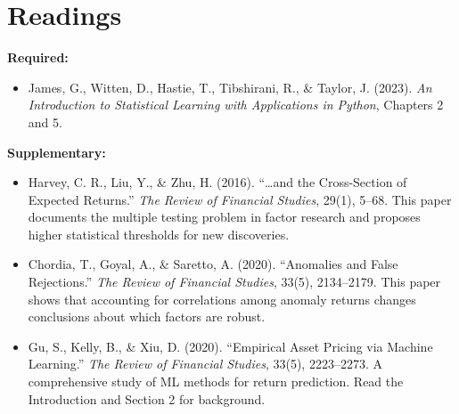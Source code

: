 \documentclass[11pt,a4paper]{article}
\begin{document}
\section*{Readings}

\textbf{Required:}
\begin{itemize}
    \item James, G., Witten, D., Hastie, T., Tibshirani, R., \& Taylor, J. (2023). \textit{An Introduction to Statistical Learning with Applications in Python}, Chapters 2 and 5.
\end{itemize}

\textbf{Supplementary:}
\begin{itemize}
    \item Harvey, C. R., Liu, Y., \& Zhu, H. (2016). ``\ldots and the Cross-Section of Expected Returns.'' \textit{The Review of Financial Studies}, 29(1), 5--68. This paper documents the multiple testing problem in factor research and proposes higher statistical thresholds for new discoveries.
    \item Chordia, T., Goyal, A., \& Saretto, A. (2020). ``Anomalies and False Rejections.'' \textit{The Review of Financial Studies}, 33(5), 2134--2179. This paper shows that accounting for correlations among anomaly returns changes conclusions about which factors are robust.
    \item Gu, S., Kelly, B., \& Xiu, D. (2020). ``Empirical Asset Pricing via Machine Learning.'' \textit{The Review of Financial Studies}, 33(5), 2223--2273. A comprehensive study of ML methods for return prediction. Read the Introduction and Section 2 for background.
\end{itemize}

\end{document}
